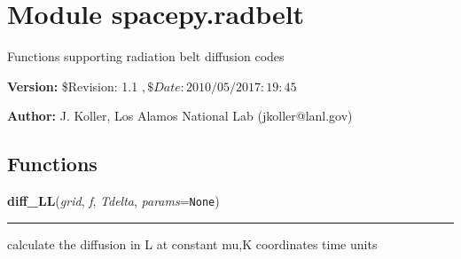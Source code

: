 %
%
%


\section{Module spacepy.radbelt}

    \label{spacepy:radbelt}
Functions supporting radiation belt diffusion codes

\textbf{Version:} \$Revision: 1.1 $, \$Date: 2010/05/20 17:19:45 $



\textbf{Author:} J. Koller, Los Alamos National Lab (jkoller@lanl.gov)





  \subsection{Functions}

    \label{spacepy:radbelt:diff_LL}

    \vspace{0.5ex}

\hspace{.8\funcindent}\begin{boxedminipage}{\funcwidth}

    \raggedright \textbf{diff\_LL}(\textit{grid}, \textit{f}, \textit{Tdelta}, \textit{params}={\tt None})

    \vspace{-1.5ex}

    \rule{\textwidth}{0.5\fboxrule}
\setlength{\parskip}{2ex}
    calculate the diffusion in L at constant mu,K coordinates time units

\setlength{\parskip}{1ex}
    \end{boxedminipage}

